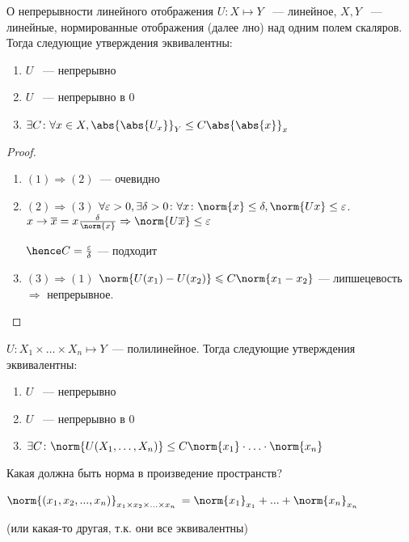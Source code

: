 \begin{namedtheorem}{О непрерывности линейного отображения}
    $U\colon X\mapsto Y$ ~--- линейное, $X,Y$ ~--- линейные,
    нормированные отображения (далее лно)
    над одним полем скаляров.
    Тогда следующие утверждения эквивалентны:
    \begin{enumerate}
        \item$U$ ~--- непрерывно
        \item $U$ ~--- непрерывно в 0
        \item $\exists C\colon \forall x\in X, \abs{\abs{U_x}}_Y\leq C\abs{\abs{x}}_x$
    \end{enumerate}
\end{namedtheorem}
\begin{proof}
    \begin{enumerate}
        \item $(1)\Rightarrow (2)$~--- очевидно
        \item  $(2)\Rightarrow (3)$
             $\forall \varepsilon > 0, \exists \delta > 0\colon
             \forall x\colon \norm{x}\leq\delta, \norm{Ux}\leq \varepsilon$.
             $x \rightarrow \overline{x} = x\frac{\delta}{\norm{x}}
             \Rightarrow \norm{U\overline{x}}\leq \varepsilon$ 

             $\hence C = \frac{\varepsilon}{\delta} $ --- подходит
        \item $(3)\Rightarrow(1)$
             $\norm{U(x_1) - U(x_2)} \leqslant C \norm{x_1 - x_2} $ --- 
             липшецевость  $\Rightarrow$ непрерывное.
    \end{enumerate}
\end{proof}
\begin{theorem}
    $U\colon X_1\times\dots \times X_n\mapsto Y$~--- полилинейное.
    Тогда следующие утверждения эквивалентны:
    \begin{enumerate}
        \item
            $U$ ~--- непрерывно
        \item 
            $U$ ~--- непрерывно в 0
        \item
            $\exists C\colon \norm{U(X_1,\dots, X_n)} \leq
            C\norm{x_1}\cdot\ldots\cdot\norm{x_n}$
    \end{enumerate}
\end{theorem}
\begin{remark}
    Какая должна быть норма в произведение пространств?

    $\norm{(x_1, x_2, ..., x_n)}_{x_1 \times x_2 \times ... \times x_n}$ 
    $= \norm{x_1}_{x_1} + ... + \norm{x_n}_{x_n}$ 
    
    (или какая-то другая, т.к. они все эквивалентны)
\end{remark}
